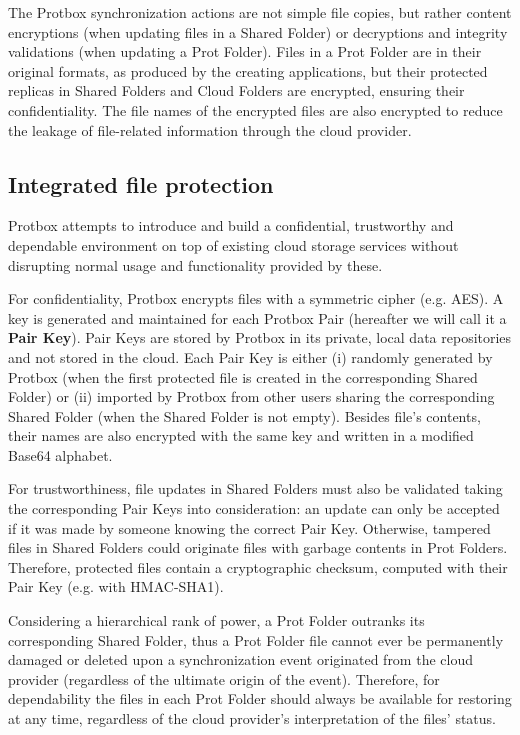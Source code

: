 \documentclass[english]{lni}
\newcommand\protbox{Protbox}
\newcommand\ProtF{Prot Folder}
\newcommand\ProtFs{Prot Folders}
\newcommand\SharedF{Shared Folder}
\newcommand\SharedFs{Shared Folders}
\newcommand\CloudFs{Cloud Folders}
\newcommand\PairKey{Pair Key}
\newcommand\PairKeys{Pair Keys}
\newcommand\PPair{{\protbox} Pair}
\begin{document}
The {\protbox} synchronization actions are not simple file copies,
but rather content encryptions (when updating files in a {\SharedF})
or decryptions and integrity validations (when updating a
{\ProtF}). Files in a {\ProtF} are in their original formats,
as produced by the creating applications, but their protected
replicas in {\SharedFs} and {\CloudFs} are encrypted, ensuring
their confidentiality. The file names of the encrypted files are
also encrypted to reduce the leakage of file-related information
through the cloud provider.

\subsection{Integrated file protection}

{\protbox} attempts to introduce and build a confidential,
trustworthy and dependable environment on top of existing cloud
storage services without disrupting normal usage and functionality
provided by these.

For confidentiality, {\protbox} encrypts files with a symmetric
cipher (e.g. AES).  A key is generated and maintained for each
{\PPair} (hereafter we will call it a \textbf{{\PairKey}}).
{\PairKeys} are stored by {\protbox} in its private, local data repositories
and not stored in the cloud. Each {\PairKey} is either (i) randomly
generated by {\protbox} (when the first protected file is created in
the corresponding {\SharedF}) or (ii) imported by {\protbox} from
other users sharing the corresponding {\SharedF} (when the {\SharedF}
is not empty). Besides file's contents, their names are also
encrypted with the same key and written in a modified Base64 alphabet.

For trustworthiness, file updates in {\SharedFs} must also be
validated taking the corresponding {\PairKeys} into consideration: an
update can only be accepted if it was made by someone knowing the
correct {\PairKey}.  Otherwise, tampered files in {\SharedFs}
could originate files with garbage contents in {\ProtFs}.
Therefore, protected files contain a cryptographic checksum,
computed with their {\PairKey} (e.g. with HMAC-SHA1).

Considering a hierarchical rank of power, a {\ProtF} outranks its
corresponding {\SharedF}, thus a {\ProtF} file cannot ever be
permanently damaged or deleted upon a synchronization event
originated from the cloud provider (regardless of the ultimate
origin of the event). Therefore, for dependability the files in
each {\ProtF} should always be available for restoring at any
time, regardless of the cloud provider's interpretation of the
files' status.
\end{document}
